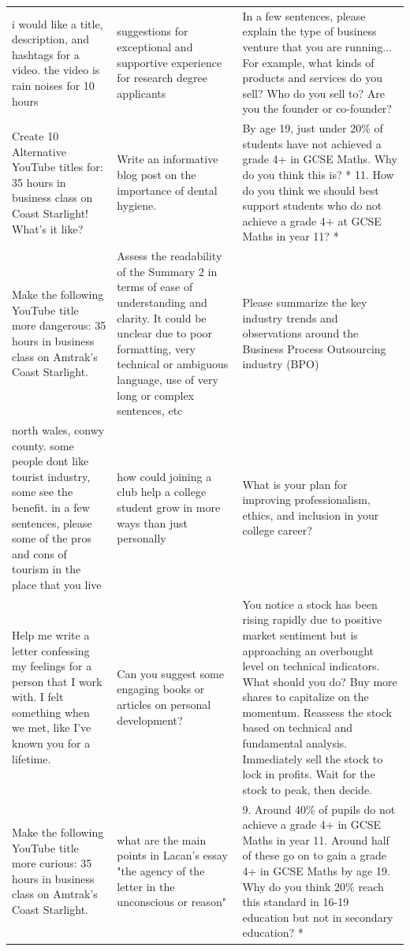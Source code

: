 \begin{table}[ht]
\begin{tabular}{p{4.3cm}p{4.3cm}p{4.3cm}}
i would like a title, description, and hashtags for a video. the video is rain noises for 10 hours & suggestions for exceptional and supportive experience for research degree applicants & In a few sentences, please explain the type of business venture that you are running...  For example, what kinds of products and services do you sell? Who do you sell to? Are you the founder or co-founder? \\[4pt]
Create 10 Alternative YouTube titles for: 35 hours in business class on Coast Starlight! What's it like? & Write an informative blog post on the importance of dental hygiene. & By age 19, just under 20\% of students have not achieved a grade 4+ in GCSE Maths. Why do you think this is? * 11. How do you think we should best support students who do not achieve a grade 4+ at GCSE Maths in year 11? * \\[4pt]
Make the following YouTube title more dangerous: 35 hours in business class on Amtrak's Coast Starlight. & Assess the readability of the Summary 2 in terms of ease of understanding and clarity. It could be unclear due to poor formatting, very technical or ambiguous language, use of very long or complex sentences, etc & Please summarize the key industry trends and observations around the Business Process Outsourcing industry (BPO) \\[4pt]
north wales, conwy county. some people dont like tourist industry, some see the benefit. in a few sentences, please some of the pros and cons of tourism in the place that you live & how could joining a club help a college student grow in more ways than just personally & What is your plan for improving professionalism, ethics, and inclusion in your college career? \\[4pt]
Help me write a letter confessing my feelings for a person that I work with. I felt something when we met, like I've known you for a lifetime. & Can you suggest some engaging books or articles on personal development? & You notice a stock has been rising rapidly due to positive market sentiment but is approaching an overbought level on technical indicators. What should you do?  Buy more shares to capitalize on the momentum.  Reassess the stock based on technical and fundamental analysis.  Immediately sell the stock to lock in profits.  Wait for the stock to peak, then decide. \\[4pt]
Make the following YouTube title more curious: 35 hours in business class on Amtrak's Coast Starlight. & what are the main points in Lacan's essay "the agency of the letter in the unconscious or reason" & 9. Around 40\% of pupils do not achieve a grade 4+ in GCSE Maths in year 11. Around half of these go on to gain a grade 4+ in GCSE Maths by age 19. Why do you think 20\% reach this standard in 16-19 education but not in secondary education? * \\[4pt]

\end{tabular}
\end{table}

